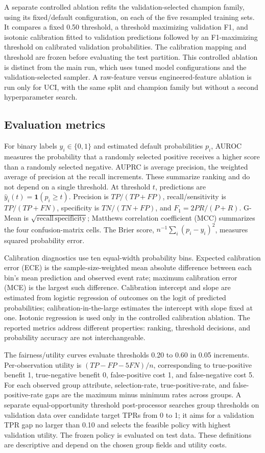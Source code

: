 \documentclass[pdflatex,sn-mathphys-num]{sn-jnl}
\begin{document}
A separate controlled ablation refits the validation-selected champion family, using its fixed/default configuration, on each of the five resampled training sets. It compares a fixed 0.50 threshold, a threshold maximizing validation F1, and isotonic calibration fitted to validation predictions followed by an F1-maximizing threshold on calibrated validation probabilities. The calibration mapping and threshold are frozen before evaluating the test partition. This controlled ablation is distinct from the main run, which uses tuned model configurations and the validation-selected sampler. A raw-feature versus engineered-feature ablation is run only for UCI, with the same split and champion family but without a second hyperparameter search.

\subsection{Evaluation metrics}
For binary labels $y_i\in\{0,1\}$ and estimated default probabilities $p_i$, AUROC measures the probability that a randomly selected positive receives a higher score than a randomly selected negative. AUPRC is average precision, the weighted average of precision at the recall increments. These summarize ranking and do not depend on a single threshold. At threshold $t$, predictions are $\hat y_i(t)=\mathbf{1}(p_i\ge t)$. Precision is $TP/(TP+FP)$, recall/sensitivity is $TP/(TP+FN)$, specificity is $TN/(TN+FP)$, and $F_1=2PR/(P+R)$. G-Mean is $\sqrt{\mathrm{recall}\,\mathrm{specificity}}$; Matthews correlation coefficient (MCC) summarizes the four confusion-matrix cells. The Brier score, $n^{-1}\sum_i(p_i-y_i)^2$, measures squared probability error.

Calibration diagnostics use ten equal-width probability bins. Expected calibration error (ECE) is the sample-size-weighted mean absolute difference between each bin's mean prediction and observed event rate; maximum calibration error (MCE) is the largest such difference. Calibration intercept and slope are estimated from logistic regression of outcomes on the logit of predicted probabilities; calibration-in-the-large estimates the intercept with slope fixed at one. Isotonic regression is used only in the controlled calibration ablation. The reported metrics address different properties: ranking, threshold decisions, and probability accuracy are not interchangeable.

The fairness/utility curves evaluate thresholds 0.20 to 0.60 in 0.05 increments. Per-observation utility is $(TP-FP-5FN)/n$, corresponding to true-positive benefit 1, true-negative benefit 0, false-positive cost 1, and false-negative cost 5. For each observed group attribute, selection-rate, true-positive-rate, and false-positive-rate gaps are the maximum minus minimum rates across groups. A separate equal-opportunity threshold post-processor searches group thresholds on validation data over candidate target TPRs from 0 to 1; it aims for a validation TPR gap no larger than 0.10 and selects the feasible policy with highest validation utility. The frozen policy is evaluated on test data. These definitions are descriptive and depend on the chosen group fields and utility costs.
\end{document}

